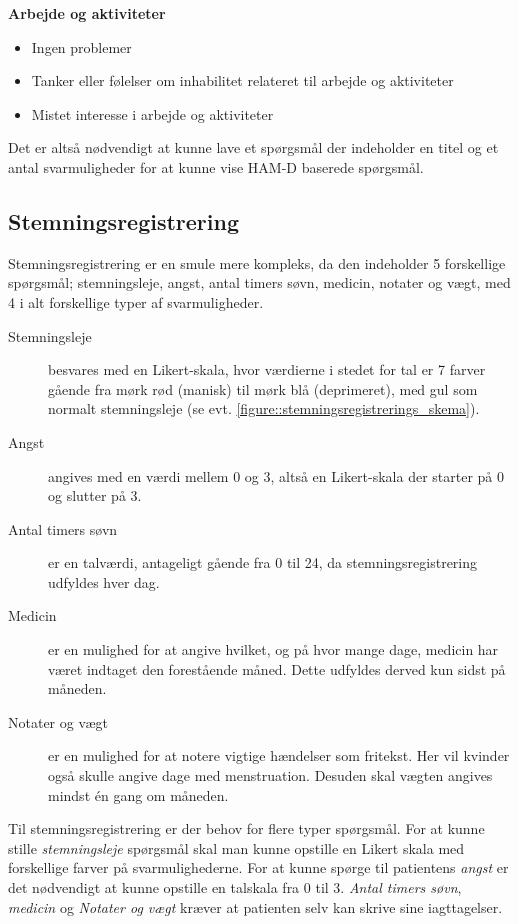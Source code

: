 \textbf{Arbejde og aktiviteter}
\begin{itemize}
\item Ingen problemer
\item Tanker eller følelser om inhabilitet relateret til arbejde og aktiviteter
\item Mistet interesse i arbejde og aktiviteter 
\end{itemize}

Det er altså nødvendigt at kunne lave et spørgsmål der indeholder en titel og et antal svarmuligheder for at kunne vise HAM-D baserede spørgsmål.

\subsection{Stemningsregistrering}\label{krav:stemningsregistrering}
Stemningsregistrering er en smule mere kompleks, da den indeholder 5 forskellige spørgsmål; stemningsleje, angst, antal timers søvn, medicin, notater og vægt, med 4 i alt forskellige typer af svarmuligheder.

\begin{description}
\item[Stemningsleje] besvares med en Likert-skala, hvor værdierne i stedet for tal er 7 farver gående fra mørk rød (manisk) til mørk blå (deprimeret), med gul som normalt stemningsleje (se evt. \cref{figure::stemningsregistrerings_skema}).

\item[Angst] angives med en værdi mellem 0 og 3, altså en Likert-skala der starter på 0 og slutter på 3.

\item[Antal timers søvn] er en talværdi, antageligt gående fra 0 til 24, da stemningsregistrering udfyldes hver dag.

\item[Medicin] er en mulighed for at angive hvilket, og på hvor mange dage, medicin har været indtaget den forestående måned.
Dette udfyldes derved kun sidst på måneden.

\item[Notater og vægt] er en mulighed for at notere vigtige hændelser som fritekst.
Her vil kvinder også skulle angive dage med menstruation.
Desuden skal vægten angives mindst én gang om måneden.
\end{description}

Til stemningsregistrering er der behov for flere typer spørgsmål.
For at kunne stille \emph{stemningsleje} spørgsmål skal man kunne opstille en Likert skala med forskellige farver på svarmulighederne.
For at kunne spørge til patientens \emph{angst} er det nødvendigt at kunne opstille en talskala fra 0 til 3.
\emph{Antal timers søvn}, \emph{medicin} og \emph{Notater og vægt} kræver at patienten selv kan skrive sine iagttagelser.

